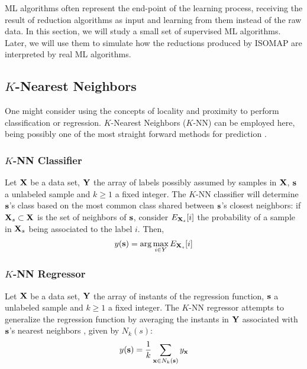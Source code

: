 ML algorithms often represent the end-point of the learning process, receiving the result of reduction algorithms as input and learning from them instead of the raw data. In this section, we will study a small set of supervised ML algorithms. Later, we will use them to simulate how the reductions produced by ISOMAP are interpreted by real ML algorithms.

\subsection{$K$-Nearest Neighbors}

One might consider using the concepts of locality and proximity to perform classification or regression. $K$-Nearest Neighbors ($K$-NN) can be employed here, being possibly one of the most straight forward methods for prediction \cite{elkan2011nearest}.

\subsubsection{$K$-NN Classifier}

Let $\mathbf{X}$ be a data set, $\mathbf{Y}$ the array of labels possibly assumed by samples in $\mathbf{X}$, $\mathbf{s}$ a unlabeled sample and $k \ge 1$ a fixed integer. The $K$-NN classifier will determine $\mathbf{s}$'s class based on the most common class shared between $\mathbf{s}$'s closest neighbors: if $\mathbf{X}_s \subset \mathbf{X}$ is the set of neighbors of $\mathbf{s}$, consider $E_{\mathbf{X}_s}[i]$ the probability of a sample in $\mathbf{X}_s$ being associated to the label $i$. Then,
\begin{align*}
	y(\mathbf{s}) = \arg \max_{i \in Y} E_{\mathbf{X}_s}[i]
\end{align*}

\subsubsection{$K$-NN Regressor}

Let $\mathbf{X}$ be a data set, $\mathbf{Y}$ the array of instants of the regression function, $\mathbf{s}$ a unlabeled sample and $k \ge 1$ a fixed integer.
The $K$-NN regressor attempts to generalize the regression function by averaging the instants in $\mathbf{Y}$ associated with $\mathbf{s}$'s nearest neighbors \cite{kramer2013dimensionality}, given by $N_k(s)$:	
\begin{align*}
	y(\mathbf{s}) = \frac{1}{k} \sum_{\mathbf{x} \in N_k(\mathbf{s})} y_{\mathbf{x}}
\end{align*}

